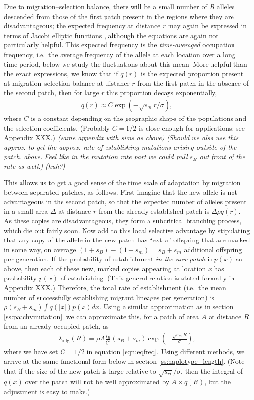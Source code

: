 \documentclass{article}
\newcommand{\migrate}{\lambda_\text{mig}}
\newcommand{\gc}[1]{{\it\color{green}(#1)} }
\newcommand{\plr}[1]{{\it\color{blue}(#1)}}
\begin{document}
Due to migration--selection balance, 
there will be a small number of $B$ alleles descended from those of the first patch
present in the regions where they are disadvantageous;
the expected frequency at distance $r$ may again be expressed in terms of Jacobi elliptic functions \citep[Appendix XXX][]{barton},
although the equations are again not particularly helpful.
This expected frequency is the \emph{time-averaged} occupation frequency,
i.e.\ the average frequency of the allele at each location over a long time period,
below we study the fluctuations about this mean.
More helpful than the exact expressions,
we know that if $q(r)$ is the expected proportion present at migration--selection balance at distance $r$ from the first patch
in the absence of the second patch, 
then for large $r$ this proportion decays exponentially, 
\begin{align} \label{eqn:eqfreq}
  q(r) \approx C \exp( -\sqrt{s_m} r / \sigma),
\end{align}
where $C$ is a constant depending on the geographic shape of the populations and the selection coefficients. 
(Probably $C=1/2$ is close enough for applications; see Appendix XXX.)
\plr{same appendix with sims as above}
\gc{Should we also use this approx. to get the approx. rate of establishing mutations
arising outside of the patch, above. Feel like in the mutation rate
part we could pull $s_B$ out front of the rate as well.} 
\plr{huh?}

This allows us to get a good sense of the time scale of adaptation by migration between separated patches, as follows.
First imagine that the new allele is not advantageous in the second patch,
so that the expected number of alleles present in a small area $\Delta$ at distance $r$ from the already established patch
is $\Delta \rho q(r)$.
As these copies are disadvantageous, they form a subcritical branching process, which die out fairly soon.
Now add to this local selective advantage by stipulating that any copy of the allele in the new patch
has ``extra'' offspring that are marked in some way, on average $(1+s_B)-(1-s_m)=s_B+s_m$ additional offspring per generation.
If the probability of establishment \emph{in the new patch} is $p(x)$ as above,
then each of these new, marked copies appearing at location $x$ has probability $p(x)$ of establishing.
(This general relation is stated formally in Appendix XXX.)
Therefore, the total rate of establishment 
(i.e.\ the mean number of successfully establishing migrant lineages per generation)
is $\rho (s_B+s_m) \int q(|x|) p(x) dx$.
Using a similar approximation as in section \ref{ss:patchymutation},
we can approximate this, for a patch of area $A$ at distance $R$ from an already occupied patch, as
\begin{align}
  \migrate(R) = \rho A \frac{s_B}{\xi^2} (s_B+s_m) \exp\left( -\frac{ \sqrt{s_m} R}{\sigma} \right),
\end{align}
where we have set $C=1/2$ in equation \eqref{eqn:eqfreq}.
Using different methods, we arrive at the same functional form below in section \ref{ss:haplotype_length}.
(Note that if the size of the new patch is large relative to $\sqrt{s_m}/\sigma$,
then the integral of $q(x)$ over the patch will not be well approximated by $A \times q(R)$,
but the adjustment is easy to make.)
\end{document}
